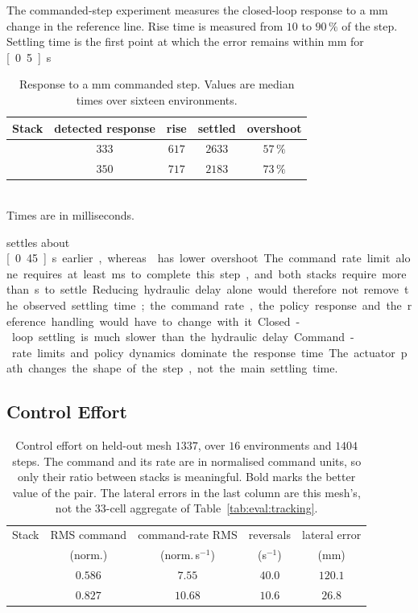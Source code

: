 The commanded-step experiment measures the closed-loop response to a
\unit[100]{mm} change in the reference line. Rise time is measured from
$10$ to $90\,\%$ of the step. Settling time is the first point at which the
error remains within \unit[20]{mm} for \unit[0.5]{s}.
\label{sec:eval:step-response}

\begin{table}[tbp]
  \centering
  \caption{Response to a \unit[100]{mm} commanded step. Values are median
  times over sixteen environments.}
  \label{tab:eval:step}
  \begin{tabular}{lcccc}
    \toprule
    Stack & detected response & rise & settled & overshoot \\
    \midrule
    \ppoROM{} & $333$ & $617$ & $2633$ & $57\,\%$ \\
    \ppoIDFD{} & $350$ & $717$ & $2183$ & $73\,\%$ \\
    \bottomrule
  \end{tabular}
  \\[2pt]
  \footnotesize Times are in milliseconds.
\end{table}

\ppoIDFD{} settles about \unit[0.45]{s} earlier, whereas \ppoROM{} has lower
overshoot. The command rate limit alone requires at least \unit[417]{ms} to
complete this step, and both stacks require more than \unit[2]{s} to settle.
Reducing hydraulic delay alone would therefore not remove the observed settling
time; the command rate, the policy response and the reference handling would
have to change with it.

Closed-loop settling is much slower than the hydraulic delay. Command-rate
limits and policy dynamics dominate the response time. The actuator path changes
the shape of the step, not the main settling time.

\subsection{Control Effort}
\label{sec:eval:effort}

\begin{table}[tbp]
  \centering
  \caption{Control effort on held-out mesh $1337$, over $16$ environments and
  $1404$ steps. The command and its rate are in normalised command units, so
  only their ratio between stacks is meaningful. Bold marks the better value of
  the pair. The lateral errors in the last column are this mesh's, not the
  $33$-cell aggregate of Table~\ref{tab:eval:tracking}.}
  \label{tab:eval:effort}
  \begin{tabular}{lcccc}
    \toprule
    Stack & RMS command & command-rate RMS & reversals & lateral error \\
     & (norm.) & (norm.\,s$^{-1}$) & (s$^{-1}$) & (mm) \\
    \midrule
    \ppoROM{} & $0.586$ & $7.55$ & $40.0$ & $120.1$ \\
    \ppoIDFD{} & $0.827$ & $10.68$ & $\mathbf{10.6}$ & $\mathbf{26.8}$ \\
    \bottomrule
  \end{tabular}
\end{table}

